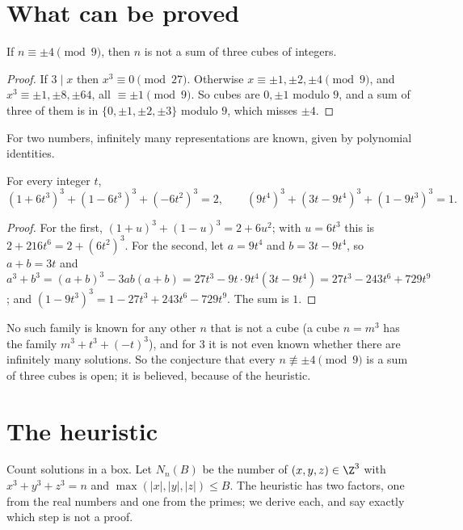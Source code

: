 \section{What can be proved}

\begin{proposition}\label{prop:mod9}
If $n\equiv\pm4\pmod9$, then $n$ is not a sum of three cubes of integers.
\end{proposition}

\begin{proof}
If $3\mid x$ then $x^3\equiv0\pmod{27}$. Otherwise $x\equiv\pm1,\pm2,\pm4\pmod9$, and $x^3\equiv\pm1,\pm8,\pm64$, all $\equiv\pm1\pmod9$. So cubes are $0,\pm1$ modulo $9$, and a sum of three of them is in
$\{0,\pm1,\pm2,\pm3\}$ modulo $9$, which misses $\pm4$.
\end{proof}

For two numbers, infinitely many representations are known, given by polynomial identities.

\begin{proposition}\label{prop:families}
For every integer $t$,
\[
(1+6t^3)^3+(1-6t^3)^3+(-6t^2)^3=2,\qquad(9t^4)^3+(3t-9t^4)^3+(1-9t^3)^3=1.
\]
\end{proposition}

\begin{proof}
For the first, $(1+u)^3+(1-u)^3=2+6u^2$; with $u=6t^3$ this is $2+216t^6=2+(6t^2)^3$. For the second, let $a=9t^4$ and $b=3t-9t^4$, so $a+b=3t$ and
$a^3+b^3=(a+b)^3-3ab(a+b)=27t^3-9t\cdot9t^4(3t-9t^4)=27t^3-243t^6+729t^9$; and $(1-9t^3)^3=1-27t^3+243t^6-729t^9$. The sum is $1$.
\end{proof}

No such family is known for any other $n$ that is not a cube (a cube $n=m^3$ has the family $m^3+t^3+(-t)^3$), and for $3$ it is not even known whether there are infinitely many
solutions. So the conjecture that every $n\not\equiv\pm4\pmod9$ is a sum of three cubes is open; it is believed, because of the heuristic.

\section{The heuristic}

Count solutions in a box. Let $N_n(B)$ be the number of $(x,y,z)\in\Z^3$ with $x^3+y^3+z^3=n$ and $\max(|x|,|y|,|z|)\le B$. The heuristic has two factors, one from the real numbers and one from the
primes; we derive each, and say exactly which step is not a proof.

